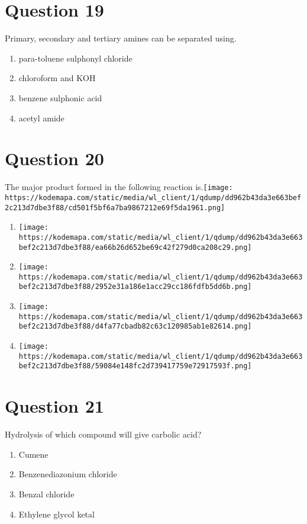 \documentclass{article}
\begin{document}
\section*{Question 19}
Primary, secondary and tertiary amines can be separated using. 
\begin{enumerate}[label=(\alph*)]
\item para-toluene sulphonyl chloride
\item chloroform and \(\mathrm{KOH}\)
\item benzene sulphonic acid
\item acetyl amide
\end{enumerate}
\newpage
\section*{Question 20}
The major product formed in the following reaction is.\texttt{[image: https://kodemapa.com/static/media/wl\_client/1/qdump/dd962b43da3e663bef2c213d7dbe3f88/cd501f5bf6a7ba9867212e69f5da1961.png]}\newline
\begin{enumerate}[label=(\alph*)]
\item \texttt{[image: https://kodemapa.com/static/media/wl\_client/1/qdump/dd962b43da3e663bef2c213d7dbe3f88/ea66b26d652be69c42f279d0ca208c29.png]}
\item \texttt{[image: https://kodemapa.com/static/media/wl\_client/1/qdump/dd962b43da3e663bef2c213d7dbe3f88/2952e31a186e1acc29cc186fdfb5dd6b.png]}
\item \texttt{[image: https://kodemapa.com/static/media/wl\_client/1/qdump/dd962b43da3e663bef2c213d7dbe3f88/d4fa77cbadb82c63c120985ab1e82614.png]}
\item \texttt{[image: https://kodemapa.com/static/media/wl\_client/1/qdump/dd962b43da3e663bef2c213d7dbe3f88/59084e148fc2d739417759e72917593f.png]}
\end{enumerate}
\newpage
\section*{Question 21}
Hydrolysis of which compound will give carbolic acid? 
\begin{enumerate}[label=(\alph*)]
\item Cumene
\item Benzenediazonium chloride
\item Benzal chloride
\item Ethylene glycol ketal
\end{enumerate}
\newpage
\end{document}
